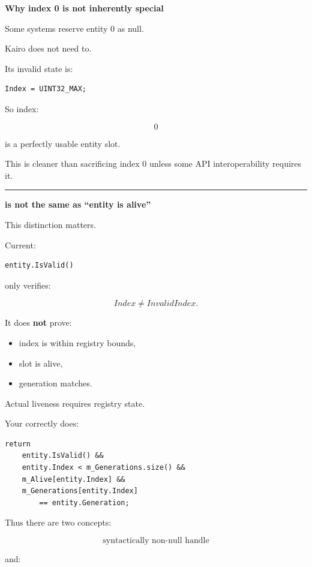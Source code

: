 \textbf{Why index 0 is not inherently special}

Some systems reserve entity 0 as null.

Kairo does not need to.

Its invalid state is:

\begin{verbatim}
Index = UINT32_MAX;
\end{verbatim}

So index:

\[
0
\]

is a perfectly usable entity slot.

This is cleaner than sacrificing index 0 unless some API interoperability requires it.

\begin{center}\rule{0.5\linewidth}{0.5pt}\end{center}

\textbf{ is not the same as ``entity is alive''}

This distinction matters.

Current:

\begin{verbatim}
entity.IsValid()
\end{verbatim}

only verifies:

\[
Index\neq InvalidIndex.
\]

It does \textbf{not} prove:

\begin{itemize}
\tightlist
\item
  index is within registry bounds,
\item
  slot is alive,
\item
  generation matches.
\end{itemize}

Actual liveness requires registry state.

Your  correctly does:

\begin{verbatim}
return
    entity.IsValid() &&
    entity.Index < m_Generations.size() &&
    m_Alive[entity.Index] &&
    m_Generations[entity.Index]
        == entity.Generation;
\end{verbatim}

Thus there are two concepts:

\[
\boxed{
\text{syntactically non-null handle}
}
\]

and:

